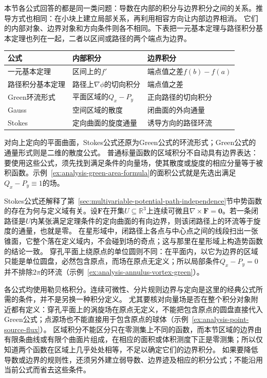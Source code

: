 本节各公式回答的都是同一类问题：导数在内部的积分与边界积分之间的关系。推导方式也相同：在小块上建立局部关系，再利用相容方向让内部边界相消。
它们的内部对象、边界对象和方向条件则各不相同。下表把一元基本定理与路径积分基本定理也列在一起，二者以区间或路径的两个端点为边界。
\begin{center}
\begin{tabular}{lll}
\toprule
公式 & 内部积分 & 边界积分\\
\midrule
一元基本定理 & 区间上的$f'$ & 端点值之差$f(b)-f(a)$\\
路径积分基本定理 & 路径上$\nabla\phi$的切向积分 & 端点值之差\\
Green环流形式 & 平面区域的$Q_x-P_y$ & 正向路径的切向积分\\
Gauss & 空间区域的散度 & 闭曲面的外向通量\\
Stokes & 定向曲面的旋度通量 & 诱导方向的路径环流\\
\bottomrule
\end{tabular}
\end{center}
对向上定向的平面曲面，Stokes公式还原为Green公式的环流形式；Green公式的通量形式则是二维的散度公式。
普通标量函数的区域积分不自动具有边界表达：要使用这些公式，须先找到满足条件的向量场，使其散度或旋度的相应分量等于被积函数。示例~\ref{ex:analysis-green-area-formula}的面积公式就是先选出满足$Q_x-P_y\equiv1$的场。

Stokes公式还解释了第~\ref{sec:multivariable-potential-path-independence}节中势函数的存在为何与定义域有关。设$\bm F$在开集$U\subseteq\mathbb R^3$上连续可微且$\nabla\times\bm F=\bm0$。若一条闭路径是$U$内某张满足定理条件的定向曲面的有向边界，则该闭路径上的环流等于旋度的通量，也就是零。
在星形域中，闭路径上各点与中心点之间的线段扫出一张锥面，它整个落在定义域内，不会碰到场的奇点；这与那里在星形域上构造势函数的结论一致。
穿孔平面上绕原点的单位圆则不同：在平面内，以它为边界的区域只能是单位圆盘，必然包含原点，而场在原点无定义；所以局部条件$Q_x-P_y=0$并不排除$2\pi$的环流（示例~\ref{ex:analysis-annulus-vortex-green}）。

各公式均使用勒贝格积分。连续可微性、分片规则边界与定向是这里的经典公式所需的条件，并不是另换一种积分定义。
尤其要核对向量场是否在整个积分对象附近都有定义：穿孔平面上的涡旋场在原点无定义，不能把包含原点的圆盘直接代入Green公式；点源场也不能直接用于包含原点的球体（示例~\ref{ex:analysis-point-source-flux}）。
区域积分不能区分只在零测集上不同的函数，而本节区域的边界由有限条曲线或有限个曲面片组成，在相应的面积或体积测度下正是零测集；所以仅知道两个函数在区域上几乎处处相等，不足以确定它们的边界积分。
如果要降低导数或边界的规则性，还须另外建立弱导数、边界迹及相应的积分公式；不能沿用当前公式而省去这些条件。

\FloatBarrier
